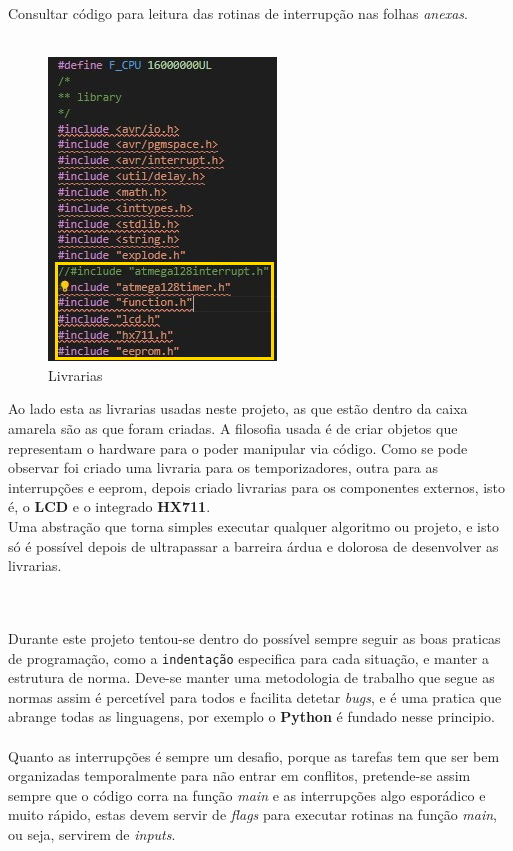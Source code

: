 Consultar código para leitura das rotinas de interrupção nas folhas \textit{anexas}.
\\
\\
\begin{minipage}{.40\linewidth}
\begin{figure}[H]
	\flushleft
	\captionsetup{justification=raggedright,singlelinecheck=false}
	\includegraphics[scale=0.9]{./image/PESTA/Code/Livrarias.jpg}
	\caption{Livrarias}
	\label{Livrarias}
\end{figure}
\end{minipage}
\begin{minipage}{.6\linewidth}
Ao lado esta as livrarias usadas neste projeto, as que estão dentro da caixa amarela são as que foram criadas.
A filosofia usada é de criar objetos que representam o hardware para o poder manipular via código. Como se pode observar foi criado uma livraria para os temporizadores, outra para as interrupções e \ac{eeprom}, depois criado livrarias para os componentes externos, isto é, o \textbf{LCD} e o integrado \textbf{HX711}.
\\
Uma abstração que torna simples executar qualquer algoritmo ou projeto, e isto só é possível depois de ultrapassar a barreira árdua e dolorosa de desenvolver as livrarias.
\\
\\
\\
\end{minipage}
Durante este projeto tentou-se dentro do possível sempre seguir as boas praticas de programação, como a \texttt{indentação} especifica para cada situação, e manter a estrutura de norma. Deve-se manter uma metodologia de trabalho que segue as normas assim é percetível para todos e facilita detetar \textit{bugs}, e é uma pratica que abrange todas as linguagens, por exemplo o \textbf{Python} é fundado nesse principio.
\\
\\
Quanto as interrupções é sempre um desafio, porque as tarefas tem que ser bem organizadas temporalmente para não entrar em conflitos, pretende-se assim sempre que o código corra na função \textit{main} e as interrupções algo esporádico e muito rápido, estas devem servir de \textit{flags} para executar rotinas na função \textit{main}, ou seja, servirem de \textit{inputs}. %
\newpage
